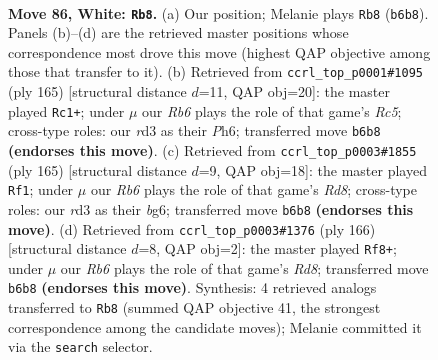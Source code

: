 \documentclass[11pt]{article}
\begin{document}
\clearpage

\begin{figure}[p]\centering
\begin{subfigure}{0.46\textwidth}\centering
\resizebox{\linewidth}{!}{%
\newchessgame
\chessboard[
  setfen={8/8/1R6/3k2K1/r6P/3r4/8/8 w - - 13 86},
  showmover=false,
  pgfstyle=straightmove, color=movearrow, markmove={b6-b8}
]}
\caption{}
\end{subfigure}\hfill
\begin{subfigure}{0.46\textwidth}\centering
\resizebox{\linewidth}{!}{%
\newchessgame
\chessboard[
  setfen={8/8/7p/8/2r3k1/R6p/8/7K b - - 7 83},
  showmover=false,
  pgfstyle=straightmove, color=movearrow, markmove={c4-c1}
]}
\caption{}
\end{subfigure}
\\[4pt]
\begin{subfigure}{0.46\textwidth}\centering
\resizebox{\linewidth}{!}{%
\newchessgame
\chessboard[
  setfen={6k1/1R4p1/6B1/8/4K3/8/8/3r4 b - - 70 83},
  showmover=false,
  pgfstyle=straightmove, color=movearrow, markmove={d1-f1}
]}
\caption{}
\end{subfigure}\hfill
\begin{subfigure}{0.46\textwidth}\centering
\resizebox{\linewidth}{!}{%
\newchessgame
\chessboard[
  setfen={3R4/8/5kP1/7K/5r2/8/8/8 w - - 2 84},
  showmover=false,
  pgfstyle=straightmove, color=movearrow, markmove={d8-f8}
]}
\caption{}
\end{subfigure}
\caption{\textbf{Move 86, White: \texttt{Rb8}.} (a) Our position; Melanie plays \texttt{Rb8} (\texttt{b6b8}). Panels (b)--(d) are the retrieved master positions whose correspondence most drove this move (highest QAP objective among those that transfer to it). (b) Retrieved from \texttt{ccrl\_top\_p0001\#1095} (ply 165) [structural distance $d$=11, QAP obj=20]: the master played \texttt{Rc1+}; under $\mu$ our \emph{Rb6} plays the role of that game's \emph{Rc5}; cross-type roles: our \emph{r}d3 as their \emph{P}h6; transferred move \texttt{b6b8} \textbf{(endorses this move)}. (c) Retrieved from \texttt{ccrl\_top\_p0003\#1855} (ply 165) [structural distance $d$=9, QAP obj=18]: the master played \texttt{Rf1}; under $\mu$ our \emph{Rb6} plays the role of that game's \emph{Rd8}; cross-type roles: our \emph{r}d3 as their \emph{b}g6; transferred move \texttt{b6b8} \textbf{(endorses this move)}. (d) Retrieved from \texttt{ccrl\_top\_p0003\#1376} (ply 166) [structural distance $d$=8, QAP obj=2]: the master played \texttt{Rf8+}; under $\mu$ our \emph{Rb6} plays the role of that game's \emph{Rd8}; transferred move \texttt{b6b8} \textbf{(endorses this move)}. Synthesis: 4 retrieved analogs transferred to \texttt{Rb8} (summed QAP objective 41, the strongest correspondence among the candidate moves); Melanie committed it via the \texttt{search} selector.}
\label{fig:thought-m170}
\end{figure}
\end{document}

